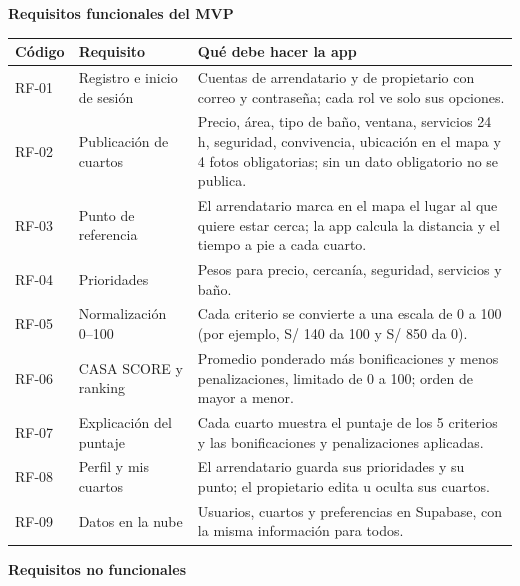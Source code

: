 \documentclass[11pt,a4paper]{article}
\begin{document}
\vspace{0.15cm}
\noindent\textbf{Requisitos funcionales del MVP}

\vspace{0.05cm}
{\small
{}
\noindent\begin{tabularx}{\textwidth}{@{}C{1.1cm} P{3.3cm} L@{}}
\toprule
{}
\textbf{Código} & \textbf{Requisito} & \textbf{Qué debe hacer la app} \\
\midrule
RF-01 & Registro e inicio de sesión & Cuentas de arrendatario y de propietario con correo y contraseña; cada rol ve solo sus opciones. \\
RF-02 & Publicación de cuartos & Precio, área, tipo de baño, ventana, servicios 24 h, seguridad, convivencia, ubicación en el mapa y 4 fotos obligatorias; sin un dato obligatorio no se publica. \\
RF-03 & Punto de referencia & El arrendatario marca en el mapa el lugar al que quiere estar cerca; la app calcula la distancia y el tiempo a pie a cada cuarto. \\
RF-04 & Prioridades & Pesos para precio, cercanía, seguridad, servicios y baño. \\
RF-05 & Normalización 0--100 & Cada criterio se convierte a una escala de 0 a 100 (por ejemplo, S/ 140 da 100 y S/ 850 da 0). \\
RF-06 & CASA SCORE y ranking & Promedio ponderado más bonificaciones y menos penalizaciones, limitado de 0 a 100; orden de mayor a menor. \\
RF-07 & Explicación del puntaje & Cada cuarto muestra el puntaje de los 5 criterios y las bonificaciones y penalizaciones aplicadas. \\
RF-08 & Perfil y mis cuartos & El arrendatario guarda sus prioridades y su punto; el propietario edita u oculta sus cuartos. \\
RF-09 & Datos en la nube & Usuarios, cuartos y preferencias en Supabase, con la misma información para todos. \\
\bottomrule
\end{tabularx}
}

\vspace{0.15cm}
\noindent\textbf{Requisitos no funcionales}
\end{document}
